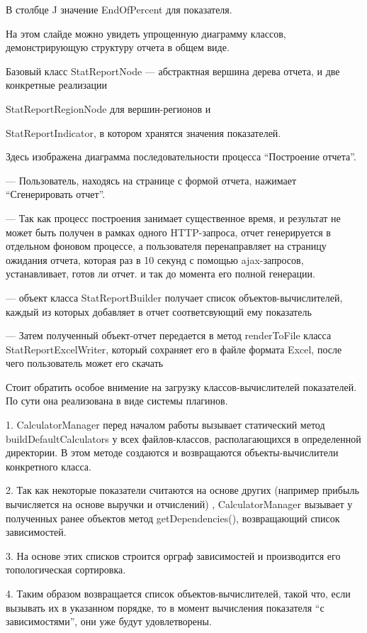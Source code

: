 \documentclass[a4paper]{article}
\begin{document}
В столбце J значение EndOfPercent для показателя.

\newpage

На этом слайде можно увидеть упрощенную диаграмму классов, демонстрирующую структуру отчета в общем виде.

Базовый класс StatReportNode --- абстрактная вершина дерева отчета,
и две конкретные реализации 

StatReportRegionNode для вершин-регионов и

StatReportIndicator, в котором хранятся значения показателей.

\newpage

Здесь изображена диаграмма последовательности процесса “Построение отчета”.

--- Пользователь, находясь на странице с формой отчета, нажимает “Сгенерировать отчет”.

--- Так как процесс построения занимает существенное время, и результат не может быть получен в рамках одного HTTP-запроса, 
отчет генерируется в отдельном фоновом процессе, а пользователя перенаправляет на страницу ожидания отчета, которая раз в 10 секунд с помощью ajax-запросов, устанавливает, готов ли отчет.
и так до момента его полной генерации.

--- объект класса StatReportBuilder получает список объектов-вычислителей, каждый из которых добавляет в отчет соответсвующий ему показатель

--- Затем полученный объект-отчет передается в метод renderToFile класса StatReportExcelWriter, который сохраняет его в файле формата Excel, после чего пользователь может его скачать

\newpage
Стоит обратить особое внимение на загрузку классов-вычислителей показателей. По сути она реализована в виде системы плагинов.

1. CalculatorManager перед началом работы вызывает статический метод buildDefaultCalculators у всех файлов-классов, располагающихся в определенной директории.
В этом методе создаются и возвращаются объекты-вычислители конкретного класса.

2. Так как некоторые показатели считаются на основе других 
(например прибыль вычисляется на основе выручки и отчислений)
, CalculatorManager вызывает у полученных ранее объектов метод getDependencies(), возвращающий список зависимостей.

3. На основе этих списков строится орграф зависимостей и производится его топологическая сортировка.

4. Таким образом возвращается список объектов-вычислителей, такой что, если вызывать их в указанном порядке, то в момент вычисления показателя “с зависимостями”, они уже будут удовлетворены.
\end{document}

